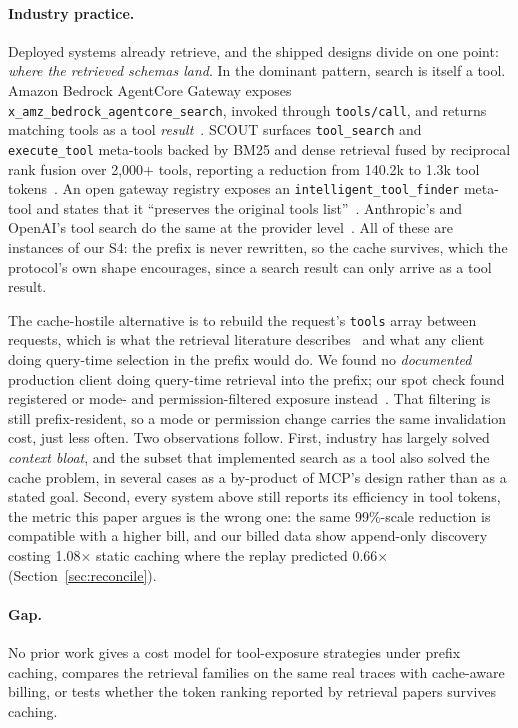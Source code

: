\documentclass[11pt]{article}
\begin{document}
\paragraph{Industry practice.} Deployed systems already retrieve, and the shipped designs divide on one point: \emph{where the retrieved schemas land}. In the dominant pattern, search is itself a tool. Amazon Bedrock AgentCore Gateway exposes \texttt{x\_amz\_bedrock\_agentcore\_search}, invoked through \texttt{tools/call}, and returns matching tools as a tool \emph{result}~\cite{agentcore}. SCOUT surfaces \texttt{tool\_search} and \texttt{execute\_tool} meta-tools backed by BM25 and dense retrieval fused by reciprocal rank fusion over 2,000+ tools, reporting a reduction from 140.2k to 1.3k tool tokens~\cite{scout}. An open gateway registry exposes an \texttt{intelligent\_tool\_finder} meta-tool and states that it ``preserves the original tools list''~\cite{gatewayreg}. Anthropic's and OpenAI's tool search do the same at the provider level~\cite{anth_toolsearch,oai_toolsearch}. All of these are instances of our S4: the prefix is never rewritten, so the cache survives, which the protocol's own shape encourages, since a search result can only arrive as a tool result.

The cache-hostile alternative is to rebuild the request's \texttt{tools} array between requests, which is what the retrieval literature describes~\cite{ragmcp,mcpzero,semdisc} and what any client doing query-time selection in the prefix would do. We found no \emph{documented} production client doing query-time retrieval into the prefix; our spot check found registered or mode- and permission-filtered exposure instead~\cite{cline,continuedev,geminicli,opencode}. That filtering is still prefix-resident, so a mode or permission change carries the same invalidation cost, just less often. Two observations follow. First, industry has largely solved \emph{context bloat}, and the subset that implemented search as a tool also solved the cache problem, in several cases as a by-product of MCP's design rather than as a stated goal. Second, every system above still reports its efficiency in tool tokens, the metric this paper argues is the wrong one: the same 99\%-scale reduction is compatible with a higher bill, and our billed data show append-only discovery costing 1.08$\times$ static caching where the replay predicted 0.66$\times$ (Section~\ref{sec:reconcile}).

\paragraph{Gap.} No prior work gives a cost model for tool-exposure strategies under prefix caching, compares the retrieval families on the same real traces with cache-aware billing, or tests whether the token ranking reported by retrieval papers survives caching.
\end{document}
